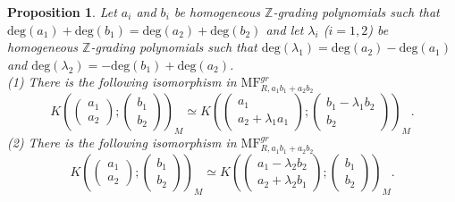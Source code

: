 \documentclass[10pt]{amsart}
\theoremstyle{break}
\newtheorem{pro}[de]{Proposition}
\begin{document}
\begin{pro}\label{equiv}
Let $a_i$ and $b_i$ be homogeneous ${{\mathbb{Z}}}$-grading polynomials such that ${{\mathrm{deg}}} (a_1) +{{\mathrm{deg}}} (b_1) ={{\mathrm{deg}}} (a_2) +{{\mathrm{deg}}} (b_2)$ and let $\lambda_i$ {\rm ($i=1,2$)} be homogeneous ${{\mathbb{Z}}}$-grading polynomials such that ${{\mathrm{deg}}} ( \lambda_1 )={{\mathrm{deg}}} (a_2) - {{\mathrm{deg}}} (a_1)$ and ${{\mathrm{deg}}} ( \lambda_2 )=-{{\mathrm{deg}}} (b_1) + {{\mathrm{deg}}} (a_2)$. \\
{\rm (1)} There is the following isomorphism in ${{\mathrm{MF}}}^{gr}_{R,a_1 b_1 + a_2 b_2}$ 
$$
K\left(\left(
\begin{array}{c}
	 a_1\\
	 a_2
\end{array}
\right);
\left(
\begin{array}{c}
	 b_1\\
	 b_2
\end{array}
\right)\right)_{M}
\simeq
K\left(\left(
\begin{array}{c}
	 a_1\\
	 a_2 + \lambda_1 a_1
\end{array}
\right);
\left(
\begin{array}{c}
	 b_1 - \lambda_1 b_2\\
	 b_2
\end{array}
\right)\right)_{M}.
$$
{\rm (2)} There is the following isomorphism in ${{\mathrm{MF}}}^{gr}_{R,a_1 b_1 + a_2 b_2}$ 
$$
K\left(\left(
\begin{array}{c}
	 a_1\\
	 a_2
\end{array}
\right);
\left(
\begin{array}{c}
	 b_1\\
	 b_2
\end{array}
\right)\right)_{M}
\simeq
K\left(\left(
\begin{array}{c}
	 a_1 - \lambda_2 b_2\\
	 a_2 + \lambda_2 b_1
\end{array}
\right);
\left(
\begin{array}{c}
	 b_1\\
	 b_2
\end{array}
\right)\right)_{M}.
$$

\end{pro}
\end{document}
